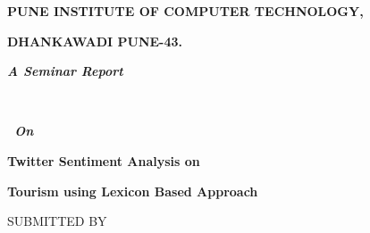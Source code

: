 \documentclass[12pt]{article}
\begin{document}
\vspace{\baselineskip}

\vspace{\baselineskip}
\begin{Center}
{\fontsize{14pt}{16.8pt}\selectfont \textbf{PUNE INSTITUTE OF COMPUTER TECHNOLOGY,}\par}
\end{Center}\par

\begin{Center}
{\fontsize{14pt}{16.8pt}\selectfont \textbf{DHANKAWADI PUNE-43.}\par}
\end{Center}\par

\begin{Center}
{\fontsize{26pt}{31.2pt}\selectfont \textbf{\textit{A Seminar Report}}\par}
\end{Center}\par

\begin{Center}
\textbf{\textit{ }\ \ \ \  }{\fontsize{24pt}{28.8pt}\selectfont \textbf{\textit{\ On  }\  }\par}
\end{Center}\par

\begin{Center}
{\fontsize{16pt}{19.2pt}\selectfont \textbf{ Twitter Sentiment Analysis on}\par}
\end{Center}\par

\begin{Center}
{\fontsize{16pt}{19.2pt}\selectfont \textbf{Tourism using Lexicon Based Approach}\par}
\end{Center}\par

\begin{Center}
{\fontsize{14pt}{16.8pt}\selectfont  \par}
\end{Center}\par

\begin{Center}
{\fontsize{14pt}{16.8pt}\selectfont SUBMITTED BY\par}
\end{Center}\par
\end{document}
